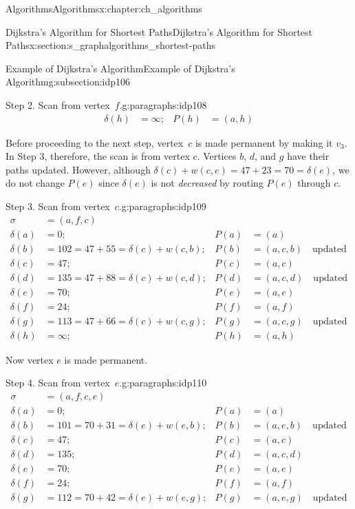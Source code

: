\documentclass[oneside,10pt,]{book}
\numberwithin{equation}{section}
\newcommand{\amp}{&}
\begin{document}
\begin{chapterptx}{Algorithms}{}{Algorithms}{}{}{x:chapter:ch_algorithms}
\begin{sectionptx}{Dijkstra's Algorithm for Shortest Paths}{}{Dijkstra's Algorithm for Shortest Paths}{}{}{x:section:s_graphalgorithms_shortest-paths}
\begin{subsectionptx}{Example of Dijkstra's Algorithm}{}{Example of Dijkstra's Algorithm}{}{}{g:subsection:idp106}
\begin{paragraphs}{Step 2.  Scan from vertex~\(f\).}{g:paragraphs:idp108}
\begin{align*}
\delta(h)\amp=\infty; \amp P(h)\amp=(a,h)
\end{align*}
%
\par
Before proceeding to the next step, vertex~\(c\) is made permanent by making it \(v_3\). In Step 3, therefore, the scan is from vertex \(c\). Vertices \(b\), \(d\), and \(g\) have their paths updated. However, although \(\delta(c) + w(c,e) = 47+23=70=\delta(e)\), we do not change \(P(e)\) since \(\delta(e)\) is not \emph{decreased} by routing \(P(e)\) through \(c\).%
\end{paragraphs}%
\begin{paragraphs}{Step 3.  Scan from vertex~\(c\).}{g:paragraphs:idp109}%
%
\begin{align*}
\sigma\amp=(a,f,c)\\
\delta(a)\amp=0; \amp P(a)\amp=(a)\\
\delta(b)\amp=102=47+55= \delta(c)+w(c,b); \amp P(b)\amp=(a,c,b)\quad\text{updated}\\
\delta(c)\amp=47; \amp P(c)\amp=(a,c)\\
\delta(d)\amp=135=47+88 = \delta(c)+w(c,d); \amp P(d)\amp=(a,c,d)\quad\text{updated} \\
\delta(e)\amp=70; \amp P(e)\amp=(a,e)\\
\delta(f)\amp=24; \amp P(f)\amp=(a,f)\\
\delta(g)\amp=113=47+66= \delta(c)+w(c,g); \amp P(g)\amp=(a,c,g)\quad\text{updated} \\
\delta(h)\amp=\infty; \amp P(h)\amp=(a,h)
\end{align*}
%
\par
Now vertex \(e\) is made permanent.%
\end{paragraphs}%
\begin{paragraphs}{Step 4.  Scan from vertex~\(e\).}{g:paragraphs:idp110}%
%
\begin{align*}
\sigma\amp=(a,f,c,e)\\
\delta(a)\amp=0; \amp P(a)\amp=(a)\\
\delta(b)\amp=101=70+31= \delta(e)+w(e,b); \amp P(b)\amp=(a,e,b)\quad\text{updated}\\
\delta(c)\amp=47; \amp P(c)\amp=(a,c)\\
\delta(d)\amp=135; \amp P(d)\amp=(a,c,d)\\
\delta(e)\amp=70; \amp P(e)\amp=(a,e)\\
\delta(f)\amp=24; \amp P(f)\amp=(a,f)\\
\delta(g)\amp=112=70+42= \delta(e)+w(e,g); \amp P(g)\amp=(a,e,g)\quad\text{updated}\\

\end{align*}
\end{paragraphs}
\end{subsectionptx}
\end{sectionptx}
\end{chapterptx}
\end{document}
